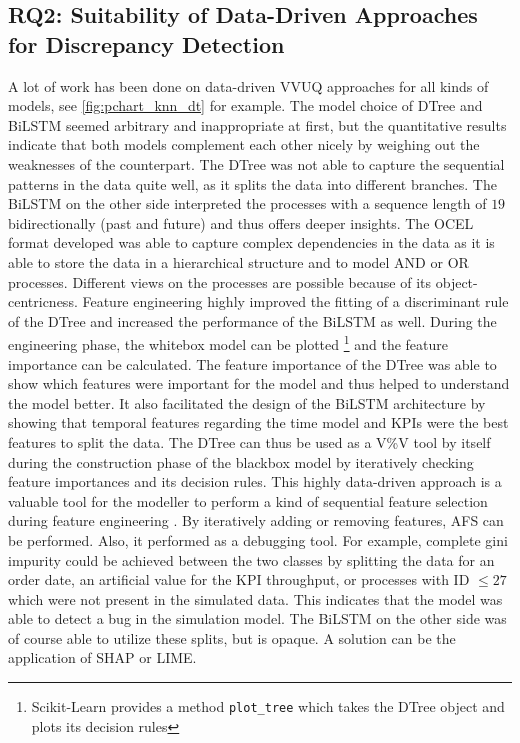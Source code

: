 \subsection{RQ2: Suitability of Data-Driven Approaches for Discrepancy Detection}
\label{sec:discussion_rq2}
A lot of work has been done on data-driven VVUQ approaches for all kinds of models, see \autoref{fig:pchart_knn_dt} for example. The model choice of DTree and BiLSTM seemed arbitrary and inappropriate at first, but the quantitative results indicate that both models complement each other nicely by weighing out the weaknesses of the counterpart. The DTree was not able to capture the sequential patterns in the data quite well, as it splits the data into different branches. The BiLSTM on the other side interpreted the processes with a sequence length of $19$ bidirectionally (past and future) and thus offers deeper insights. The OCEL format developed was able to capture complex dependencies in the data as it is able to store the data in a hierarchical structure and to model AND or OR processes. Different views on the processes are possible because of its object-centricness. Feature engineering highly improved the fitting of a discriminant rule of the DTree and increased the performance of the BiLSTM as well. During the engineering phase, the whitebox model can be plotted \footnote{Scikit-Learn provides a method \texttt{plot\_tree} which takes the DTree object and plots its decision rules} and the feature importance can be calculated. The feature importance of the DTree was able to show which features were important for the model and thus helped to understand the model better. It also facilitated the design of the BiLSTM architecture by showing that temporal features regarding the time model and KPIs were the best features to split the data. The DTree can thus be used as a V\%V tool by itself during the construction phase of the blackbox model by iteratively checking feature importances and its decision rules. This highly data-driven approach is a valuable tool for the modeller to perform a kind of sequential feature selection during feature engineering \autocite{pudil1994floating}. By iteratively adding or removing features, AFS can be performed. Also, it performed as a debugging tool. For example, complete gini impurity could be achieved between the two classes by splitting the data for an order date, an artificial value for the KPI throughput, or processes with ID $\le 27$ which were not present in the simulated data. This indicates that the model was able to detect a bug in the simulation model. The BiLSTM on the other side was of course able to utilize these splits, but is opaque. A solution can be the application of SHAP or LIME.

